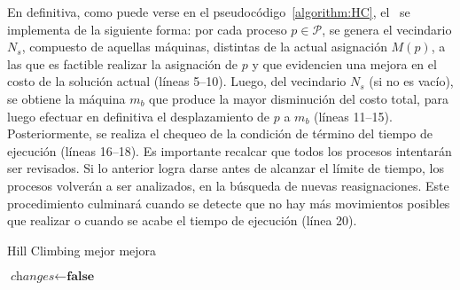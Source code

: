 \documentclass[../informe2.tex]{subfiles}
\begin{document}
En definitiva, como puede verse en el pseudocódigo~\ref{algorithm:HC}, el \hillc\ se implementa de la siguiente forma: por cada proceso $p \in \mathcal{P}$, se genera el vecindario $N_s$, compuesto de aquellas máquinas, distintas de la actual asignación $M(p)$, a las que es factible realizar la asignación de $p$ y que evidencien una mejora en el costo de la solución actual (líneas 5--10). Luego, del vecindario $N_s$ (si no es vacío), se obtiene la máquina $m_b$ que produce la mayor disminución del costo total, para luego efectuar en definitiva el desplazamiento de $p$ a $m_b$ (líneas 11--15). Posteriormente, se realiza el
chequeo de la condición de término del tiempo de ejecución (líneas 16--18). Es importante recalcar que todos los procesos intentarán ser revisados. Si lo anterior logra darse antes de alcanzar el límite de tiempo, los procesos volverán a ser analizados, en la búsqueda de nuevas reasignaciones. Este procedimiento culminará cuando se detecte que no hay más movimientos posibles que realizar o cuando se acabe el tiempo de ejecución (línea 20).
\begin{algorithm}[h]
	\caption{Hill Climbing mejor mejora}\label{algorithm:HC}
	\begin{algorithmic}[1]
		\Repeat{}
			\State{} $\textit{changes}\gets \textbf{false}$
					\EndIf{}
				\EndFor{}
				\EndIf{}
				\EndIf{}
			\EndFor{}
		\EndProcedure{}
	\end{algorithmic}
\end{algorithm}
\end{document}
